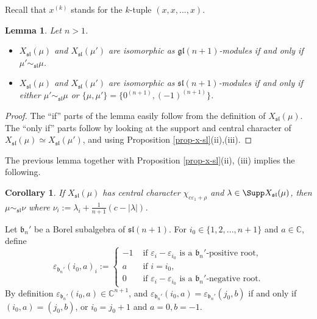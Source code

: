 \documentclass[12pt]{amsart}
\newcommand{\C}{{\mathbb C}}
\def\gb{\mathfrak{b}}
\newtheorem{lem}[thm]{Lemma}
\newtheorem{cor}[thm]{Corollary}
\begin{document}
Recall that $x^{(k)}$ stands for the $k$-tuple $(x,x,...,x)$.
\begin{lem} \label{lem-x-sl-iso}  Let $n>1$.
\begin{itemize}
\item[(i)] $X_{\mathfrak{sl}}(\mu)$ and $X_{\mathfrak{sl}}(\mu')$ are isomorphic as $\mathfrak{gl}(n+1)$-modules if and only if $\mu' \sim_\mathfrak{sl} \mu$.
\item[(ii)] $X_{\mathfrak{sl}}(\mu)$ and $X_{\mathfrak{sl}}(\mu')$ are isomorphic as $\mathfrak{sl}({n+1})$-modules  if and only if either $\mu' \sim_{\mathfrak{sl}} \mu$ or $\{\mu,\mu'\} = \{ 0^{(n+1)}, (-1)^{(n+1)}\}$. 
\end{itemize}
\end{lem}
\begin{proof} The ``if'' parts of the lemma easily follow from the definition of $X_{\mathfrak{sl}}(\mu)$. The ``only if'' parts follow by looking at the support and central character of $X_{\mathfrak{sl}}(\mu) \simeq X_{\mathfrak{sl}}(\mu')$, and using Proposition \ref{prop-x-sl}(ii),(iii).
\end{proof}

The previous lemma together with Proposition \ref{prop-x-sl}(ii), (iii) implies the following.
\begin{cor} \label{cor-x-sl}
 If $X_{\mathfrak{sl}}(\mu)$  has central character $\chi_{c\varepsilon_1 + \rho}$ and $\lambda \in \Supp X_{\mathfrak{sl}} (\mu)$, then $\mu \sim_{\mathfrak{sl}} \nu$ where $\nu_i := \lambda_i + \frac{1}{n+1} \left( c - |\lambda| \right)$.
\end{cor}

Let $\gb_n'$ be a  Borel subalgebra  of $\mathfrak{sl} (n+1)$.    For   $i_0 \in \{1,2,...,n+1 \}$ and $a \in \C$, define 
$$\varepsilon_{\gb_n'} (i_0,a)_i :=   
\begin{cases} 
 -1& \mbox{ if } \varepsilon_i - \varepsilon_{i_0} \mbox{ is a } \gb_n'\mbox{-positive root},\\
 a& \mbox{ if } i = i_0,\\
 0& \mbox{ if } \varepsilon_i - \varepsilon_{i_0} \mbox{ is a } \gb_n'\mbox{-negative root}.
\end{cases}
 $$
By definition $\varepsilon_{\gb_n'} (i_0,a) \in \C^{n+1}$, and $\varepsilon_{\gb_n'} (i_0,a) = \varepsilon_{\gb_n'} (j_0,b)$ if and only if $(i_0,a) = (j_0,b)$, or $i_0=j_0+1$ and $a =0, b=-1$. 
\end{document}
